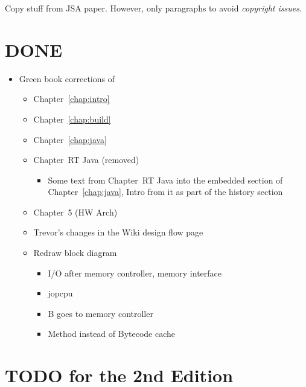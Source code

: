 Copy stuff from JSA paper. However, only paragraphs to avoid
\emph{copyright issues}.

\chapter{DONE}

\begin{itemize}
  \item Green book corrections of
  \begin{itemize}
    \item Chapter~\ref{chap:intro}
    \item Chapter~\ref{chap:build}
    \item Chapter~\ref{chap:java}
    \item Chapter~RT Java (removed)
    \begin{itemize}
      \item Some text from Chapter~RT Java into the
          embedded section of Chapter~\ref{chap:java},
          Intro from it as part of the history section
    \end{itemize}
    \item Chapter~5 (HW Arch)
    \item Trevor's changes in the Wiki design flow page
    \item Redraw block diagram
    \begin{itemize}
      \item I/O after memory controller, memory interface
      \item jopcpu
      \item B goes to memory controller
      \item Method instead of Bytecode cache
    \end{itemize}

  \end{itemize}
\end{itemize}

\chapter{TODO for the 2nd Edition}

